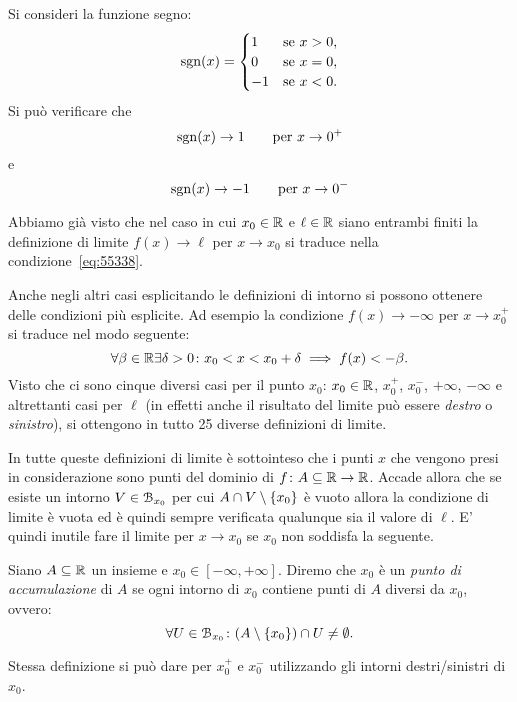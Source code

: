 \begin{example}
Si consideri la funzione segno:
\[
\operatorname{sgn}(x) =
\begin{cases}
  1 & \text{se $x>0$},\\
  0 & \text{se $x=0$},\\
  -1 & \text{se $x<0$}.
\end{cases}
\]
Si può verificare che
\[
\operatorname{sgn}(x) \to 1 \qquad \text{per $x\to 0^+$}
\]
e
\[
\operatorname{sgn}(x) \to -1 \qquad \text{per $x\to 0^-$}
\]
\end{example}

Abbiamo già visto che nel caso in cui $x_0\in {\mathbb R}$ e $\ell\in {\mathbb R}$ 
siano entrambi finiti 
la definizione di limite $f(x)\to \ell$ per $x\to x_0$
si traduce nella condizione~\eqref{eq:55338}.

Anche negli altri casi esplicitando le definizioni di intorno
si possono ottenere delle condizioni più esplicite.
Ad esempio la condizione $f(x)\to -\infty$ per $x\to x_0^+$
si traduce nel modo seguente:
\[
\forall \beta\in {\mathbb R}\exists \delta>0 \colon x_0 < x < x_0+\delta 
\implies f(x) < -\beta.  
\]
Visto che ci sono cinque diversi casi per il punto $x_0$:
$x_0\in {\mathbb R}$, $x_0^+$, $x_0^-$, $+\infty$, $-\infty$ e altrettanti 
casi per $\ell$ (in effetti anche il risultato del limite 
può essere \emph{destro} o \emph{sinistro}), si ottengono 
in tutto 25 diverse definizioni di limite.

In tutte queste definizioni di limite è sottointeso che i punti 
$x$ che vengono presi in considerazione sono punti 
del dominio di $f\colon A \subseteq {\mathbb R} \to {\mathbb R}$.
Accade allora che se esiste un intorno $V\in \mathcal B_{x_0}$
per cui $A \cap V \setminus {\left\{ x_0 \right\}}$ è vuoto allora 
la condizione di limite è vuota ed è quindi sempre verificata 
qualunque sia il valore di $\ell$. 
E' quindi inutile fare il limite per $x\to x_0$ 
se $x_0$ non soddisfa la seguente.

\begin{definition}
  \mymark{*}
  Siano $A\subseteq  {\mathbb R}$ un insieme e $x_0\in [-\infty, +\infty]$.
  Diremo che $x_0$ è un \emph{punto di accumulazione}%
%
 di $A$
  se ogni intorno di $x_0$ contiene punti di $A$ diversi da $x_0$, ovvero:
  \[
   \forall U \in \mathcal B_{x_0}\colon (A\setminus {\left\{ x_0 \right\}}) \cap U \neq \emptyset.
  \]

  Stessa definizione si può dare per $x_0^+$ e $x_0^-$ 
  utilizzando gli intorni destri/sinistri di $x_0$. 
\end{definition}

